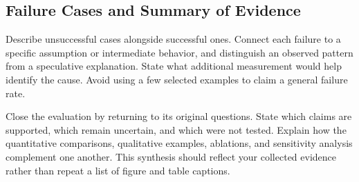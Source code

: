 \subsection{Failure Cases and Summary of Evidence}
Describe unsuccessful cases alongside successful ones. Connect each failure
to a specific assumption or intermediate behavior, and distinguish an
observed pattern from a speculative explanation. State what additional
measurement would help identify the cause. Avoid using a few selected
examples to claim a general failure rate.

Close the evaluation by returning to its original questions. State which
claims are supported, which remain uncertain, and which were not tested.
Explain how the quantitative comparisons, qualitative examples, ablations,
and sensitivity analysis complement one another. This synthesis should
reflect your collected evidence rather than repeat a list of figure and
table captions.
